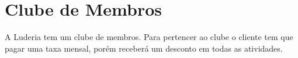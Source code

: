 \chapter{Clube de Membros}
\label{chap:clube}

A Luderia tem um clube de membros. Para pertencer ao clube o cliente tem que pagar uma taxa mensal, porém receberá um desconto em todas as atividades.

